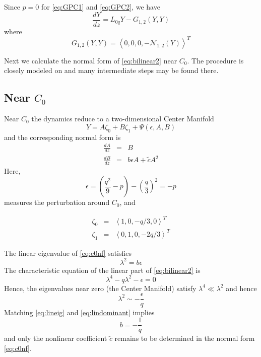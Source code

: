 Since $p=0$ for \eqref{eq:GPC1} and \eqref{eq:GPC2}, we have 
\begin{equation} \label{eq:bilinear2}
 \frac{ dY }{ dz } = L_{0q} Y - G_{1,2}(Y,Y) 
\end{equation}
where 
\begin{equation}\label{eq:nonlinear}
G_{1,2}(Y,Y) = \left<0,0,0,-\mathcal{N}_{1,2}\left(Y\right)\right>^T
\end{equation}

Next we calculate the normal form of \eqref{eq:bilinear2} near $C_0$. The procedure is
closely modeled on \cite{IA} and many intermediate steps may be found there. 


\subsection{ Near $C_0$ }

Near $C_0$ the dynamics reduce to a two-dimensional Center Manifold
\begin{equation}\label{eq:c0cm}
 Y = A \zeta_0 + B \zeta_1 + \Psi(\epsilon,A,B)
\end{equation}
and the corresponding normal form is
\begin{subequations}\label{eq:c0nf}
\begin{eqnarray}
\frac{dA}{dz} &=& B \label{eq:c0nfa} \\
\frac{dB}{dz} &=& b \epsilon A + \tilde{c} A^2 \label{eq:c0nfb}
\end{eqnarray}
\end{subequations}
Here,
\begin{equation}
\epsilon = \left( \frac{q^2}{9} - p\right) - \left(\frac{q}{3}\right)^2 = - p 
\end{equation}
measures the perturbation around $C_0$, and

\begin{subequations}\label{eq:lineareigs}
\begin{eqnarray}
\zeta_0 &=& \left<1,0,-q/3,0\right>^T\\
\zeta_1 &=& \left<0,1,0,-2 q/3\right>^T 
\end{eqnarray}
\end{subequations}

The linear eigenvalue of \eqref{eq:c0nf} satisfies 
\begin{equation}\label{eq:lineig}
\lambda^2 = b \epsilon 
\end{equation}
The characteristic equation of the linear part of 
\eqref{eq:bilinear2} is 
\begin{equation}\label{eq:charlinear}
\lambda^4 - q \lambda^2 - \epsilon =  0 
\end{equation}
Hence, the eigenvalues near zero (the Center Manifold) satisfy $\lambda^4 \ll \lambda^2$ and hence 
\begin{equation}\label{eq:lindominant}
\lambda^2 \sim -\frac{\epsilon}{q}
\end{equation}
Matching \eqref{eq:lineig} and \eqref{eq:lindominant} implies
\begin{equation}
b = - \frac{1}{q}
\end{equation}
and only the nonlinear coefficient $\tilde{c}$ remains to be determined in the normal form \eqref{eq:c0nf}.

